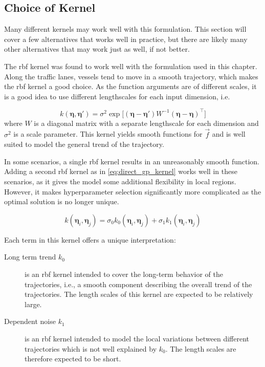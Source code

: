 \subsection{Choice of Kernel}
Many different kernels may work well with this formulation. This section will cover a few alternatives that works well in practice, but there are likely many other alternatives that may work just as well, if not better. 

The \acrshort{rbf} kernel was found to work well with the formulation used in this chapter. Along the traffic lanes, vessels tend to move in a smooth trajectory, which makes the \acrshort{rbf} kernel a good choice. As the function arguments are of different scales, it is a good idea to use different lengthscales for each input dimension, i.e.

\begin{equation}
    k(\boldsymbol{\eta}, \boldsymbol{\eta}') = \sigma^2 \exp \big[ (\boldsymbol{\eta} - \boldsymbol{\eta}') W^{-1} (\boldsymbol{\eta} - \boldsymbol{\eta})^\intercal \big]
\end{equation}
where $W$ is a diagonal matrix with a separate lengthscale for each dimension and $\sigma^2$ is a scale parameter. This kernel yields smooth functions for $\vec{f}$ and is well suited to model the general trend of the trajectory.

In some scenarios, a single \acrshort{rbf} kernel results in an unreasonably smooth function. Adding a second \acrshort{rbf} kernel as in \cref{eq:direct_gp_kernel} works well in these scenarios, as it gives the model some additional flexibility in local regions. However, it makes hyperparameter selection significantly more complicated as the optimal solution is no longer unique.  

\begin{equation}\label{eq:direct_gp_kernel}
    k(\boldsymbol{\eta}_i, \boldsymbol{\eta}_j) = \sigma_0 k_0(\boldsymbol{\eta}_i, \boldsymbol{\eta}_j) + \sigma_1 k_1(\boldsymbol{\eta}_i, \boldsymbol{\eta}_j)
\end{equation}

Each term in this kernel offers a unique interpretation:
\begin{description}
    \item[Long term trend $k_0$] is an \acrshort{rbf} kernel intended to cover the long-term behavior of the trajectories, i.e., a smooth component describing the overall trend of the trajectories. The length scales of this kernel are expected to be relatively large.
    \item[Dependent noise $k_1$] is an \acrshort{rbf} kernel intended to model the local variations between different trajectories which is not well explained by $k_0$. The length scales are therefore expected to be short.
\end{description}

